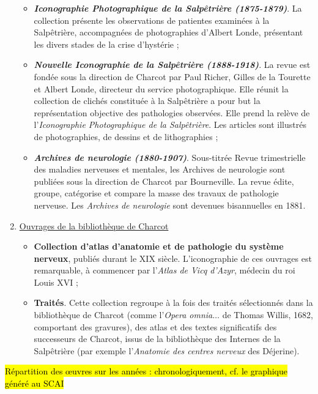 \begin{enumerate}
\begin{itemize}
\item \textbf{\textit{Iconographie Photographique de la Salpêtrière (1875-1879)}}. La collection présente les observations de patientes examinées à la Salpêtrière, accompagnées de photographies d'Albert Londe, présentant les divers stades de la crise d'hystérie ;
\item \textbf{\textit{Nouvelle Iconographie de la Salpêtrière (1888-1918)}}. La revue est fondée sous la direction de Charcot par Paul Richer, Gilles de la Tourette et Albert Londe, directeur du service photographique. Elle réunit la collection de clichés constituée à la Salpêtrière a pour but la représentation objective des pathologies observées. Elle prend la relève de l'\textit{Iconographie Photographique de la Salpêtrière}. Les articles sont illustrés de photographies, de dessins et de lithographies ;
\item \textbf{\textit{Archives de neurologie (1880-1907)}}. Sous-titrée \og{}Revue trimestrielle des maladies nerveuses et mentales\fg{}, les Archives de neurologie sont publiées sous la direction de Charcot par Bourneville. La revue édite, groupe, catégorise et compare la masse des travaux de pathologie nerveuse. Les \textit{Archives de neurologie} sont devenues bisannuelles en 1881.
\end{itemize}
\item \underline{Ouvrages de la bibliothèque de Charcot}
\begin{itemize}
\item \textbf{Collection d'atlas d'anatomie et de pathologie du système nerveux}, publiés durant le XIX\ieme{} siècle. L'iconographie de ces ouvrages est remarquable, à commencer par l'\textit{Atlas de Vicq d'Azyr}, médecin du roi Louis XVI ;
\item \textbf{Traités}. Cette collection regroupe à la fois des traités sélectionnés dans la bibliothèque de Charcot (comme l'\textit{Opera omnia}$\dots$ de Thomas Willis, 1682, comportant des gravures), des atlas et des textes significatifs des successeurs de Charcot, issus de la bibliothèque des Internes de la Salpêtrière (par exemple l'\textit{Anatomie des centres nerveux} des Déjerine).
\end{itemize}
\end{enumerate}

\hl{Répartition des \oe{}uvres sur les années : chronologiquement, cf. le graphique généré au SCAI}

